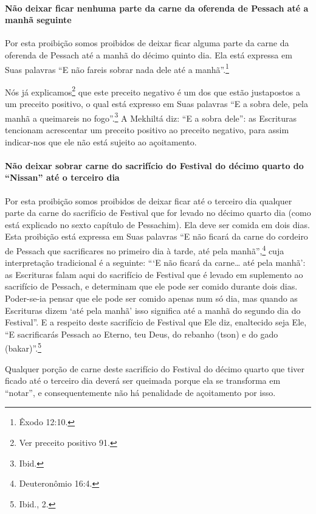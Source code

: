 \paragraph{Não deixar ficar nenhuma parte da carne da oferenda
de Pessach até a manhã seguinte}

Por esta proibição somos proibidos de deixar ficar alguma parte da carne
da oferenda de Pessach até a manhã do décimo quinto dia. Ela está
expressa em Suas palavras ``E não fareis sobrar nada dele até a manhã''.\footnote{Êxodo 12:10.}

Nós já explicamos\footnote{Ver preceito positivo 91.} que este preceito negativo é um
dos que estão justapostos a um preceito positivo, o qual está expresso
em Suas palavras ``E a sobra dele, pela manhã a queimareis no fogo''.\footnote{Ibid.} A Mekhiltá diz: ``E a sobra dele'': as Escrituras tencionam
acrescentar um preceito positivo ao preceito negativo, para assim
indicar-nos que ele não está sujeito ao açoitamento.

\paragraph{Não deixar sobrar carne do sacrifício do Festival do décimo quarto
do ``Nissan'' até o terceiro dia}

Por esta proibição somos proibidos de deixar ficar até o terceiro dia
qualquer parte da carne do sacrifício de Festival que for levado no
décimo quarto dia (como está explicado no sexto capítulo de Pessachim).
Ela deve ser comida em dois dias. Esta proibição está expressa em Suas
palavras ``E não ficará da carne do cordeiro de Pessach que
sacrificares no primeiro dia à tarde, até pela manhã'',\footnote{Deuteronômio
16:4.} cuja interpretação tradicional é a seguinte: ```E não ficará da
carne\ldots{} até pela manhã': as Escrituras falam aqui do sacrifício de
Festival que é levado em suplemento ao sacrifício de Pessach, e
determinam que ele pode ser comido durante dois dias. Poder-se-ia pensar
que ele pode ser
comido apenas num só dia, mas quando as Escrituras dizem `até pela
manhã' isso significa até a manhã do segundo dia do Festival''. E a
respeito deste sacrifício de Festival que Ele diz, enaltecido seja Ele,
``E sacrificarás Pessach ao Eterno, teu Deus, do rebanho (tson) e do
gado (bakar)''.\footnote{Ibid., 2.}

Qualquer porção de carne deste sacrifício do Festival do décimo quarto
que tiver ficado até o terceiro dia deverá ser queimada porque ela se
transforma em ``notar'', e consequentemente não há penalidade de
açoitamento por isso.

